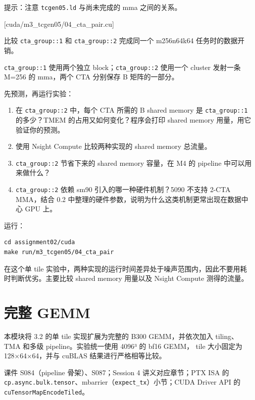 \documentclass[11pt,a4paper,fontset=fandol]{ctexart}
\begin{document}
提示：注意 \texttt{tcgen05.ld} 与尚未完成的 mma 之间的关系。

[cuda/m3\_tcgen05/04\_cta\_pair.cu]

比较 \texttt{cta\_group::1} 和 \texttt{cta\_group::2} 完成同一个
m256n64k64 任务时的数据开销。

\texttt{cta\_group::1} 使用两个独立 block；\texttt{cta\_group::2}
使用一个 cluster 发射一条 M=256 的 mma，两个 CTA 分别保存 B
矩阵的一部分。

先预测，再运行实验：

\begin{enumerate}
\def\labelenumi{(\alph{enumi})}
\item
  在 \texttt{cta\_group::2} 中，每个 CTA 所需的 B shared memory 是
  \texttt{cta\_group::1} 的多少？TMEM 的占用又如何变化？程序会打印
  shared memory 用量，用它验证你的预测。
\item
  使用 Nsight Compute 比较两种实现的 shared memory 总流量。
\item
  \texttt{cta\_group::2} 节省下来的 shared memory 容量，在 M4 的
  pipeline 中可以用来做什么？
\item
  \texttt{cta\_group::2} 依赖 sm90 引入的哪一种硬件机制？5090 不支持
  2-CTA MMA，结合 0.2
  中整理的硬件参数，说明为什么这类机制更常出现在数据中心 GPU 上。
\end{enumerate}

运行：

\begin{verbatim}
cd assignment02/cuda
make run/m3_tcgen05/04_cta_pair
\end{verbatim}

在这个单 tile
实验中，两种实现的运行时间差异处于噪声范围内，因此不要用耗时判断优劣。主要比较
shared memory 用量以及 Nsight Compute 测得的流量。

\section{完整 GEMM}\label{ux5b8cux6574-gemm}

本模块将 3.2 的单 tile 实现扩展为完整的 B300 GEMM，并依次加入
tiling、TMA 和多级 pipeline。实验统一使用 4096³ 的 bf16 GEMM， tile
大小固定为 128×64×64，并与 cuBLAS 结果进行严格相等比较。

\begin{reading}

课件 S084（pipeline 骨架）、S087；Session 4 讲义对应章节；PTX ISA 的
\texttt{cp.async.bulk.tensor}、mbarrier（\texttt{expect\_tx}）小节；CUDA
Driver API 的 \texttt{cuTensorMapEncodeTiled}。

\end{reading}
\end{document}
